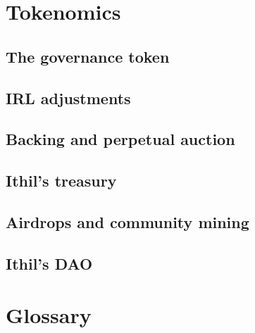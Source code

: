 \documentclass[a4paper,10 pt]{article}
\theoremstyle{definition}
\begin{document}
\section{Tokenomics}\label{tokSec}
\subsection{The governance token}\label{govSub}
\subsection{IRL adjustments}\label{irladjSub}
\subsection{Backing and perpetual auction}\label{bpaSub}
\subsection{Ithil's treasury}\label{ItSub}
\subsection{Airdrops and community mining}\label{acmSub}
\subsection{Ithil's DAO}\label{daoSub}

\section{Glossary}\label{glossSec}
\end{document}
